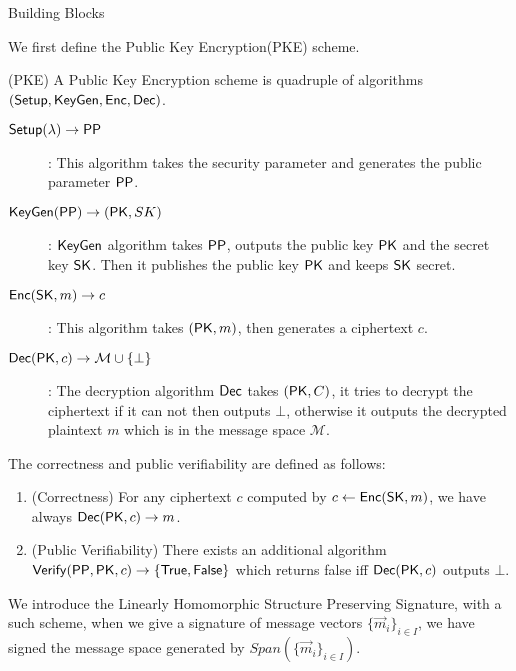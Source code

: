 \begin{subsection}{Building Blocks}

  We first define the Public Key Encryption(PKE) scheme.

  \begin{myDef}{(PKE)} A Public Key Encryption scheme is quadruple of algorithms $({\mathsf{Setup}}, {\mathsf{KeyGen}}, {\mathsf{Enc}}, {\mathsf{Dec}})$.
    \begin{description}
    \item[$\boldmath{{\mathsf{Setup}}(\lambda) \to \mathsf{PP}}$]: This algorithm takes the security parameter and generates the public parameter $\mathsf{PP}$.
    \item[$\boldmath{{\mathsf{KeyGen}}(\mathsf{PP}) \to (\mathsf{PK}, SK)}$]: ${\mathsf{KeyGen}}$ algorithm takes $\mathsf{PP}$, outputs the public key $\mathsf{PK}$ and the secret key $\mathsf{SK}$. Then it publishes the public key $\mathsf{PK}$ and keeps $\mathsf{SK}$ secret.
    \item[$\boldmath{{\mathsf{Enc}}(\mathsf{SK}, m) \to c}$]: This algorithm takes $(\mathsf{PK}, m)$, then generates a ciphertext $c$.
    \item[$\boldmath{{\mathsf{Dec}}(\mathsf{PK}, c) \to \mathcal{M} \cup \{\bot\}}$]: The decryption algorithm ${\mathsf{Dec}}$ takes $(\mathsf{PK}, C)$, it tries to decrypt the ciphertext if it can not then outputs $\bot$, otherwise it outputs the decrypted plaintext $m$ which is in the message space $\mathcal{M}$.
    \end{description}

    The correctness and public verifiability are defined as follows:
    \begin{enumerate}
    \item (Correctness) For any ciphertext $c$ computed by $c \gets {\mathsf{Enc}}(\mathsf{SK}, m)$, we have always ${\mathsf{Dec}}(\mathsf{PK}, c) \to m$.
    \item (Public Verifiability) There exists an additional algorithm ${\mathsf{Verify}}(\mathsf{PP}, \mathsf{PK}, c) \to \{\mathsf{True}, \mathsf{False}\}$ which returns false iff ${\mathsf{Dec}}(\mathsf{PK}, c)$ outputs $\bot$. 
    \end{enumerate}
  \end{myDef}
  

  
  We introduce the Linearly Homomorphic Structure Preserving Signature, with a such scheme, when we give a signature of message vectors $\{\vec{m}_i\}_{i \in I}$, we have signed the message space generated by $Span(\{\vec{m}_i\}_{i \in I})$.
  

\end{subsection}
